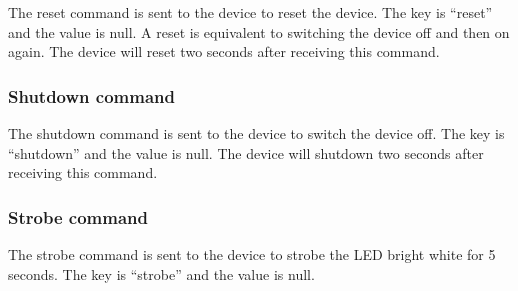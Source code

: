 The reset command is sent to the device to reset the device.  The key is \enquote{reset} and the value is null.  A reset is equivalent to switching the device off and then on again.  The device will reset two seconds after receiving this command.


\subsubsection{Shutdown command}
\label{sec:shutdownCommand}

The shutdown command is sent to the device to switch the device off.  The key is \enquote{shutdown} and the value is null.  The device will shutdown two seconds after receiving this command.





\subsubsection{Strobe command}

The strobe command is sent to the device to strobe the \ac{LED} bright white for 5 seconds.  The key is \enquote{strobe} and the value is null.




